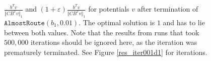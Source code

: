 \begin{figure}
\begin{center}
\end{center}
\caption{$\frac{b^Tv}{\Vert CB^Tv\Vert_1}$ and $(1+\varepsilon)\frac{b^Tv}{\Vert CB^Tv\Vert_1}$ for potentials $v$ after termination of $\texttt{AlmostRoute}(b_1,0.01)$. The optimal solution is $1$ and has to lie between both values. Note that the results from runs that took $500,000$ iterations should be ignored here, as the iteration was prematurely terminated. See Figure \ref{res_iter001d1} for iterations.}\label{res_lc001d1}
\end{figure}


